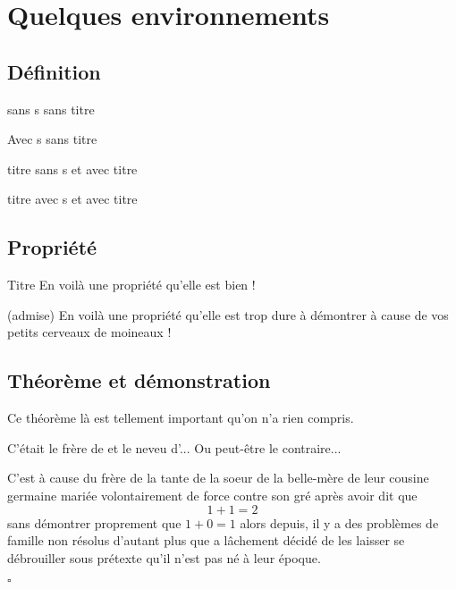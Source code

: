 \documentclass[french,10pt]{book}
\newenvironment{Demo}[1][]%
{
\normalsize
{\flushright{\textit{\textbf{Démonstration.}} #1\par}}
}
{
\strut\hfill$\square$\medskip
}
\begin{document}
\chapter{Quelques environnements}

\section{Définition}

\begin{Defi}[]{}
sans s sans titre
\end{Defi}

\begin{Defi}[s]{}
   Avec s sans titre
\end{Defi}

\begin{Defi}[]{titre}
    sans s et avec titre
\end{Defi}

\begin{Defi}[s]{titre}
    avec s et avec titre
\end{Defi}

\section{Propriété}

\begin{Prop}[s]{Titre}
    En voilà une propriété qu'elle est bien !
\end{Prop}

\begin{Prop}[]{(admise)}
    En voilà une propriété qu'elle est trop dure à démontrer à cause de vos petits cerveaux de moineaux !
\end{Prop}

\section{Théorème et démonstration}

\begin{Thm}
    Ce théorème là est tellement important qu'on n'a rien compris.
\end{Thm}

\begin{Thm}
    C'était le frère de  et le neveu d'... Ou peut-être le contraire...
\end{Thm}

\begin{Demo}
    C'est à cause du frère de la tante de la s{oe}ur de la belle-mère de leur cousine germaine mariée volontairement de force contre son gré après avoir dit que \[1 + 1 = 2\] sans démontrer proprement que $1 + 0 = 1$ alors depuis, il y a des problèmes de famille non résolus d'autant plus que  a lâchement décidé de les laisser se débrouiller sous prétexte qu'il n'est pas né à leur époque.
\end{Demo}
\end{document}
